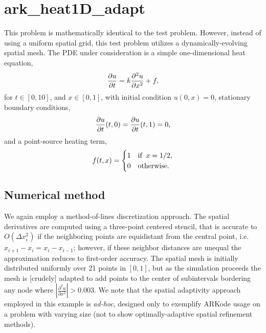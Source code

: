 \documentclass[letterpaper,10pt,english]{sphinxmanual}
\begin{document}
\section{ark\_heat1D\_adapt}
\label{c_serial:id28}\label{c_serial:ark-heat1d-adapt}
This problem is mathematically identical to the {\hyperref[c_serial:ark-heat1d]{\emph{}}} test
problem.  However, instead of using a uniform spatial grid, this test
problem utilizes a dynamically-evolving spatial mesh.  The PDE under
consideration is a simple one-dimensional heat equation,
\begin{gather}
\begin{split}\frac{\partial u}{\partial t} = k \frac{\partial^2 u}{\partial x^2} + f,\end{split}\notag
\end{gather}
for \(t \in [0, 10]\), and \(x \in [0, 1]\), with initial
condition \(u(0,x) = 0\), stationary boundary conditions,
\begin{gather}
\begin{split}\frac{\partial u}{\partial t}(t,0) = \frac{\partial u}{\partial t}(t,1) = 0,\end{split}\notag
\end{gather}
and a point-source heating term,
\begin{gather}
\begin{split}f(t,x) = \begin{cases} 1 & \text{if}\;\; x=1/2, \\
                       0 & \text{otherwise}. \end{cases}\end{split}\notag
\end{gather}

\subsection{Numerical method}
\label{c_serial:id29}
We again employ a method-of-lines discretization approach.  The
spatial derivatives are computed using a three-point centered stencil,
that is accurate to \(O(\Delta x_i^2)\) if the neighboring points are
equidistant from the central point, i.e. \(x_{i+1} - x_i = x_i -
x_{i-1}\); however, if these neighbor distances are unequal the
approximation reduces to first-order accuracy.  The spatial mesh is
initially distributed uniformly over 21 points in \([0,1]\), but
as the simulation proceeds the mesh is {[}crudely{]} adapted to add points
to the center of subintervals bordering any node where
\(\left|\frac{\partial^2 u}{\partial x^2}\right| > 0.003\).
We note that the spatial adaptivity approach employed in this example
is \emph{ad-hoc}, designed only to exemplify ARKode usage on a problem with
varying size (not to show optimally-adaptive spatial refinement
methods).
\end{document}
